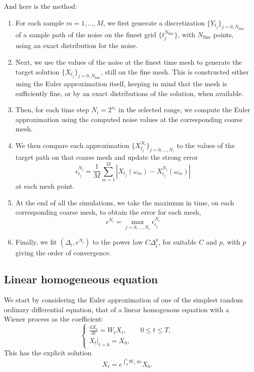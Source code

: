 \documentclass[reqno,12pt]{amsart}
\theoremstyle{plain}%
\theoremstyle{definition}
\begin{document}
And here is the method:
\begin{enumerate}
    \item For each sample $m=1, \ldots, M$, we first generate a discretization $\{Y_{t_j}\}_{j=0, N_{\mathrm{fine}}}$ of a sample path of the noise on the finest grid $\{t_j^{N_{\mathrm{fine}}}\}$, with $N_{\mathrm{fine}}$ points, using an exact distribution for the noise.
    \item Next, we use the values of the noise at the finest time mesh to generate the target solution $\{X_{t_j}\}_{j=0, N_{\mathrm{fine}}}$, still on the fine mesh. This is constructed either using the Euler approximation itself, keeping in mind that the mesh is sufficiently fine, or by an exact distributions of the solution, when available.
    \item Then, for each time step $N_i = 2^{n_i}$ in the selected range, we compute the Euler approximation using the computed noise values at the corresponding coarse mesh.
    \item We then compare each approximation $\{X_{t_j}^{N_i}\}_{j=0, \ldots, N_i}$ to the values of the target path on that coarse mesh and update the strong error
\[
    \epsilon_{t_j}^{N_i} = \frac{1}{M}\sum_{m=1}^M \left|X_{t_j}(\omega_m) - X_{t_j}^{N_i}(\omega_m)\right|
\]
at each mesh point.
    \item At the end of all the simulations, we take the maximum in time, on each corresponding coarse mesh, to obtain the error for each mesh,
\[
    \epsilon^{N_i} = \max_{j=0, \ldots, N_i} \epsilon_{t_j}^{N_i}
\]
    \item Finally, we fit $(\Delta_i, \epsilon^{N_i})$ to the power law $C\Delta_i^p$, for suitable $C$ and $p$, with $p$ giving the order of convergence.
\end{enumerate}

\subsection{Linear homogeneous equation}
\label{seclinearhomogeneousrode}

We start by considering the Euler approximation of one of the simplest random ordinary differential equation, that of a linear homogenous equation with a Wiener process as the coefficient:
\begin{equation}
    \label{linearhomogeneousrode}
    \begin{cases}
        \displaystyle \frac{\mathrm{d}X_t}{\mathrm{d} t} = W_t X_t, \qquad 0 \leq t \leq T, \\
        \left. X_t \right|_{t = 0} = X_0,
      \end{cases}
\end{equation}
This has the explicit solution
\begin{equation}
    X_t = e^{\int_0^t W_s \;\mathrm{d}s}X_0.
\end{equation}
\end{document}
